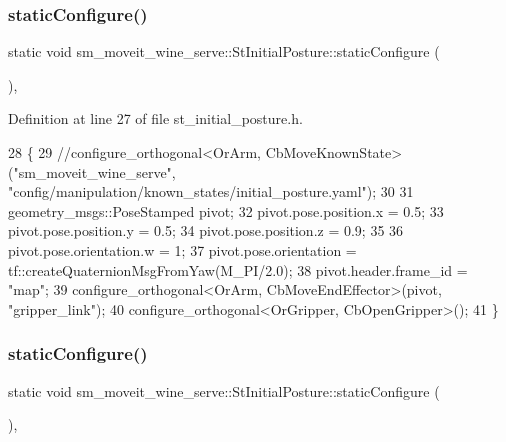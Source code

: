 \subsubsection{\texorpdfstring{static\+Configure()}{staticConfigure()}\hspace{0.1cm}{\footnotesize\ttfamily [1/2]}}
{\footnotesize\ttfamily static void sm\+\_\+moveit\+\_\+wine\+\_\+serve\+::\+St\+Initial\+Posture\+::static\+Configure (\begin{DoxyParamCaption}{ }\end{DoxyParamCaption})\hspace{0.3cm}{\ttfamily [inline]}, {\ttfamily [static]}}



Definition at line 27 of file st\+\_\+initial\+\_\+posture.\+h.


\begin{DoxyCode}
28         \{
29             \textcolor{comment}{//configure\_orthogonal<OrArm, CbMoveKnownState>("sm\_moveit\_wine\_serve",
       "config/manipulation/known\_states/initial\_posture.yaml");}
30 
31             geometry\_msgs::PoseStamped pivot;
32             pivot.pose.position.x = 0.5;
33             pivot.pose.position.y = 0.5;
34             pivot.pose.position.z = 0.9;
35             
36             pivot.pose.orientation.w = 1;
37             pivot.pose.orientation = tf::createQuaternionMsgFromYaw(M\_PI/2.0);
38             pivot.header.frame\_id = \textcolor{stringliteral}{"map"};
39             configure\_orthogonal<OrArm, CbMoveEndEffector>(pivot, \textcolor{stringliteral}{"gripper\_link"});
40             configure\_orthogonal<OrGripper, CbOpenGripper>();
41         \}
\end{DoxyCode}
\mbox{\label{structsm__moveit__wine__serve_1_1StInitialPosture_a493dc8b0a4ef49b95b16781176ec4c43}} 
\subsubsection{\texorpdfstring{static\+Configure()}{staticConfigure()}\hspace{0.1cm}{\footnotesize\ttfamily [2/2]}}
{\footnotesize\ttfamily static void sm\+\_\+moveit\+\_\+wine\+\_\+serve\+::\+St\+Initial\+Posture\+::static\+Configure (\begin{DoxyParamCaption}{ }\end{DoxyParamCaption})\hspace{0.3cm}{\ttfamily [inline]}, {\ttfamily [static]}}



